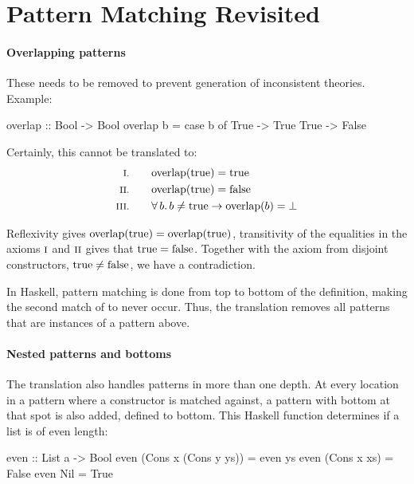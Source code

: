 \section{Pattern Matching Revisited}
\label{sec:patternsrevisited}

\paragraph{Overlapping patterns} These needs to be removed to prevent
generation of inconsistent theories. Example:

\begin{code}
overlap :: Bool -> Bool
overlap b = case b of
              True -> True
              True -> False
\end{code}

Certainly, this cannot be translated to:
\begin{align*}
\rom{1} \qquad & \fn{overlap}(\fn{true}) = \fn{true} \\
\rom{2} \qquad & \fn{overlap}(\fn{true}) = \fn{false} \\
\rom{3} \qquad & \fa{b} b \neq \fn{true} \rightarrow \fn{overlap}(b) = \bot
\end{align*}

Reflexivity gives $\mathrm{overlap}(\mathrm{true}) = \mathrm{overlap}(\mathrm{true})$,
transitivity of the equalities in the axioms $\romnodot{1}$ and
$\romnodot{2}$ gives that $\mathrm{true} = \mathrm{false}$. Together with the
axiom from disjoint constructors, $\mathrm{true} \neq \mathrm{false}$, we have
a contradiction.

In Haskell, pattern matching is done from top to bottom of the
definition, making the second match of  to never occur. Thus,
the translation removes all patterns that are instances of a pattern
above.



\paragraph{Nested patterns and bottoms} The translation also handles
patterns in more than one depth. At every location in a pattern where
a constructor is matched against, a pattern with bottom at that spot
is also added, defined to bottom. This Haskell function 
determines if a list is of even length:

\begin{code}
even :: List a -> Bool
even (Cons x (Cons y ys)) = even ys
even (Cons x xs)          = False
even Nil                  = True
\end{code}

